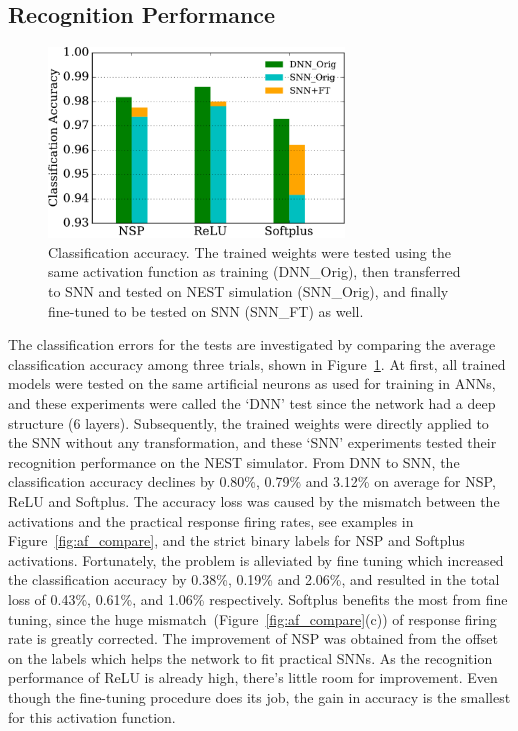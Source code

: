 \subsection{Recognition Performance}	
	\begin{figure}[tbp!]
		\centering
		\includegraphics[width=0.7\textwidth]{pics_iconip/9-2.pdf}
		\caption{Classification accuracy.
			The trained weights were tested using the same activation function as training (DNN\_Orig), then transferred to SNN and tested on NEST simulation (SNN\_Orig), and finally fine-tuned to be tested on SNN (SNN\_FT) as well.  }
		\label{Fig:result_bar}
	\end{figure}
	The classification errors for the tests are investigated by comparing the average classification accuracy among three trials, shown in Figure~\ref{Fig:result_bar}.
	At first, all trained models were tested on the same artificial neurons as used for training in ANNs, and these experiments were called the `DNN' test since the network had a deep structure (6 layers).
	Subsequently, the trained weights were directly applied to the SNN without any transformation, and these `SNN' experiments tested their recognition performance on the NEST simulator.
	From DNN to SNN, the classification accuracy declines by 0.80\%, 0.79\% and 3.12\% on average for NSP, ReLU and Softplus.
	The accuracy loss was caused by the mismatch between the activations and the practical response firing rates, see examples in Figure~\ref{fig:af_compare}, and the strict binary labels for NSP and Softplus activations.
	Fortunately, the problem is alleviated by fine tuning which increased the classification accuracy by 0.38\%, 0.19\% and 2.06\%, and resulted in the total loss of 0.43\%, 0.61\%, and 1.06\% respectively.
	Softplus benefits the most from fine tuning, since the huge mismatch~(Figure~\ref{fig:af_compare}(c)) of response firing rate is greatly corrected.
	The improvement of NSP was obtained from the offset on the labels which helps the network to fit practical SNNs.
	As the recognition performance of ReLU is already high, there's little room for improvement.
	Even though the fine-tuning procedure does its job, the gain in accuracy is the smallest for this activation function.
	

